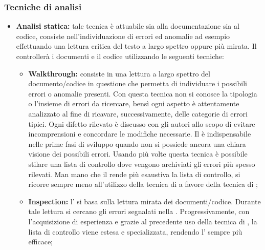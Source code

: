 \documentclass[12pt,a4paper]{article}
\begin{document}
\subsubsection{Tecniche di analisi}
\begin{itemize}
  \item \textbf{Analisi statica:} tale tecnica è attuabile sia alla documentazione sia al codice, consiste nell'individuazione di errori ed anomalie ad esempio effettuando una lettura critica del testo a largo spettro oppure più mirata. Il \VR controllerà i documenti e il codice utilizzando le seguenti tecniche:
    \begin{itemize}
      \item \textbf{Walkthrough:} consiste in una lettura a largo spettro del documento/codice in questione che permetta di individuare i possibili errori o anomalie presenti. Con questa tecnica non si conosce la tipologia o l'insieme di errori da ricercare, bensì ogni aspetto è attentamente analizzato al fine di ricavare, successivamente, delle categorie di errori tipici. Ogni difetto rilevato è discusso con gli autori allo scopo di evitare incomprensioni e concordare le modifiche necessarie. Il  è indispensabile nelle prime fasi di sviluppo quando non si possiede ancora una chiara visione dei possibili errori. Usando più volte questa tecnica è possibile stilare una lista di controllo dove vengono archiviati gli errori più spesso rilevati. Man mano che il \VR rende più esaustiva la lista di controllo, si ricorre sempre meno all'utilizzo della tecnica di  a favore della tecnica di ;
      \item \textbf{Inspection:} l' si basa sulla lettura mirata dei documenti/codice. Durante tale lettura si cercano gli errori segnalati nella . Progressivamente, con l'acquisizione di esperienza e grazie al precedente uso della tecnica di , la lista di controllo viene estesa e specializzata, rendendo l' sempre più efficace;
        \end{itemize}
\end{itemize}
\end{document}
